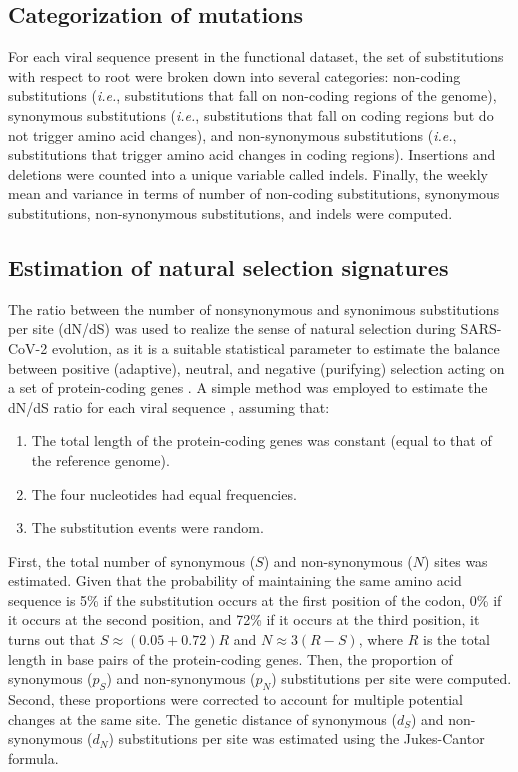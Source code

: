\subsection{Categorization of mutations}

For each viral sequence present in the functional dataset, the set of substitutions with respect to root were broken down into several categories: non-coding substitutions (\textit{i.e.}, substitutions that fall on non-coding regions of the genome), synonymous substitutions (\textit{i.e.}, substitutions that fall on coding regions but do not trigger amino acid changes), and non-synonymous substitutions (\textit{i.e.}, substitutions that trigger amino acid changes in coding regions). Insertions and deletions were counted into a unique variable called indels. Finally, the weekly mean and variance in terms of number of non-coding substitutions, synonymous substitutions, non-synonymous substitutions, and indels were computed.

\subsection{Estimation of natural selection signatures}

The ratio between the number of nonsynonymous and synonimous substitutions per site (dN/dS) was used to realize the sense of natural selection \cite{nielsen2005} during SARS-CoV-2 evolution, as it is a suitable statistical parameter to estimate the balance between positive (adaptive), neutral, and negative (purifying) selection acting on a set of protein-coding genes \cite{kryazhimskiy2008}. A simple method was employed to estimate the dN/dS ratio for each viral sequence \cite{nei1986}, assuming that:

\begin{enumerate}[i]
    \item The total length of the protein-coding genes was constant (equal to that of the reference genome).
    \item The four nucleotides had equal frequencies.
    \item The substitution events were random.
\end{enumerate}

First, the total number of synonymous ($S$) and non-synonymous ($N$) sites was estimated. Given that the probability of maintaining the same amino acid sequence is 5\% if the substitution occurs at the first position of the codon, 0\% if it occurs at the second position, and 72\% if it occurs at the third position, it turns out that $S\approx (0.05+0.72)R$  and $N\approx 3(R-S)$, where $R$ is the total length in base pairs of the protein-coding genes. Then, the proportion of synonymous ($p_S$) and non-synonymous ($p_N$) substitutions per site were computed. Second, these proportions were corrected to account for multiple potential changes at the same site. The genetic distance of synonymous ($d_S$) and non-synonymous ($d_N$) substitutions per site was estimated using the Jukes-Cantor formula. 

